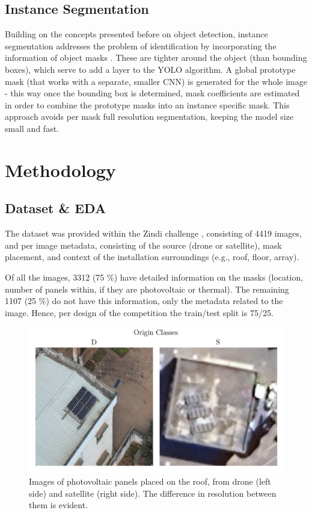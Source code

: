 \documentclass[conference]{IEEEtran}
\begin{document}
\subsection{Instance Segmentation}

Building on the concepts presented before on object detection, instance segmentation addresses the problem of identification by incorporating the information of object masks \cite{YOLOSeg}. These are tighter around the object (than bounding boxes), which serve to add a layer to the YOLO algorithm. A global prototype mask (that works with a separate, smaller CNN) is generated for the whole image - this way once the bounding box is determined, mask coefficients are estimated in order to combine the prototype masks into an instance specific mask. This approach avoids per mask full resolution segmentation, keeping the model size small and fast.



\section{Methodology}

\subsection{Dataset \& EDA}

The dataset was provided within the Zindi challenge \cite{zindi2025lacuna}, consisting of 4419 images, and per image metadata, consisting of the source (drone or satellite), mask placement, and context of the installation surroundings (e.g., roof, floor, array).

Of all the images, 3312 (75 \%) have detailed information on the masks (location, number of panels within, if they are photovoltaic or thermal). The remaining 1107 (25 \%) do not have this information, only the metadata related to the image. Hence, per design of the competition the train/test split is 75/25.

\begin{figure}[H]
    \centering
    \includegraphics[width=1\linewidth]{assets/data_origin_classes.png}
    \caption{Images of photovoltaic panels placed on the roof, from drone (left side) and satellite (right side). The difference in resolution between them is evident.}
    \label{fig:data_origin_classes}
\end{figure}
\end{document}

